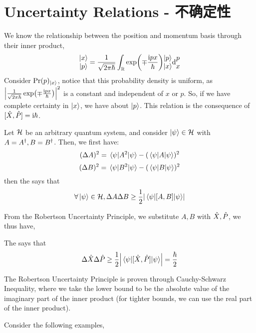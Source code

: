 \section{Uncertainty Relations - 不确定性}
We know the relationship between the position and momentum basis through their inner product, 
$$\begin{matrix}
    \ket{x} \\
    \ket{p}
\end{matrix} = \frac{1}{\sqrt{2\pi\hbar}} \int_{\mathbb{R}} \exp(\mp \frac{\mathrm{i} p x}{\hbar}) \begin{matrix}
    \ket{p} \\ \ket{x}
\end{matrix} \dd \begin{matrix}
    p \\ x
\end{matrix}$$
Consider $\text{Pr}(p)_{\ket{x}}$, notice that this probability density is uniform, as $\abs{\frac{1}{\sqrt{2\pi\hbar}}\exp(\mp \frac{\mathrm{i} p x}{\hbar})}^2$ is a constant and independent of $x$ or $p$. So, if we have complete certainty in $\ket{x}$, we have  about $\ket{p}$. This relation is the consequence of $[\hat{X}, \hat{P}] = \mathrm{i} \hbar$.
\begin{theorem}
    Let $\mathcal{H}$ be an arbitrary quantum system, and consider $\ket{\psi} \in \mathcal{H}$ with $A = A^{\dagger}, B = B^{\dagger}$. Then, we first have:
    $$(\Delta A)^2 = \expval{A^2}{\psi} - (\expval{A}{\psi})^2$$
    $$(\Delta B)^2 = \expval{B^2}{\psi} - (\expval{B}{\psi})^2$$
    then the  says that
    $$\forall \ket{\psi} \in \mathcal{H}, \Delta A \Delta B \ge \frac{1}{2}\abs{\expval{[A, B]}{\psi}}$$
\end{theorem}
From the Robertson Uncertainty Principle, we substitute $A, B$ with $\hat{X}, \hat{P}$, we thus have,
\begin{theorem}
    The  says that
    $$\Delta \hat{X} \Delta \hat{P} \ge \frac{1}{2}\abs{\expval{[\hat{X}, \hat{P}]}{\psi}} = \frac{\hbar}{2}$$
\end{theorem}
The Robertson Uncertainty Principle is proven through Cauchy-Schwarz Inequality, where we take the lower bound to be the absolute value of the imaginary part of the inner product (for tighter bounds, we can use the real part of the inner product). \par
Consider the following examples,
